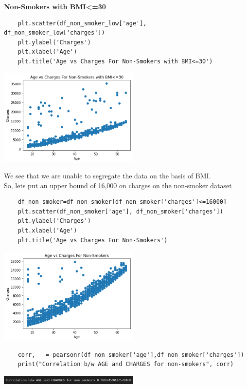 \documentclass[12pt]{article}
\numberwithin{equation}{section}
\begin{document}
{\textbf{\large{Non-Smokers with BMI<=30}}
\begin{lstlisting}
	plt.scatter(df_non_smoker_low['age'], df_non_smoker_low['charges'])
	plt.ylabel('Charges')
	plt.xlabel('Age')
	plt.title('Age vs Charges For Non-Smokers with BMI<=30')
\end{lstlisting}
\begin{center}
\includegraphics[width=7cm]{work18}
\end{center}
We see that we are unable to segregate the data on the basis of BMI.\\
So, lets put an upper bound of 16,000 on charges on the non-smoker dataset
\begin{lstlisting}
	df_non_smoker=df_non_smoker[df_non_smoker['charges']<=16000]
	plt.scatter(df_non_smoker['age'], df_non_smoker['charges'])
	plt.ylabel('Charges')
	plt.xlabel('Age')
	plt.title('Age vs Charges For Non-Smokers')
\end{lstlisting}
\begin{center}
\includegraphics[width=7cm]{work19}
\end{center}
\begin{lstlisting}
	corr, _ = pearsonr(df_non_smoker['age'],df_non_smoker['charges'])
	print("Correlation b/w AGE and CHARGES for non-smokers", corr)
\end{lstlisting}
\begin{center}
\includegraphics[width=7cm]{work20}
\end{center}
}
\end{document}
